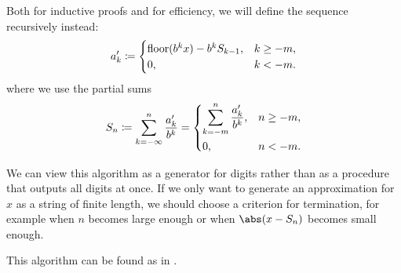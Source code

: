 \begin{algorithm}
\begin{thmenum}
     Both for inductive proofs and for efficiency, we will define the sequence recursively instead:
    \begin{equation}\label{eq:alg:real_number_radix_expansion/recursive}
      a_k' \coloneqq \begin{cases}
        \operatorname{floor}(b^k x) - b^k S_{k - 1}, &k \geq -m, \\
        0,                             &k < -m.
      \end{cases}
    \end{equation}
    where we use the partial sums
    \begin{equation*}
      S_n
      \coloneqq
      \sum_{k=-\infty}^n \frac {a'_k} {b^k}
      =
      \begin{dcases}
        \sum_{k=-m}^n \frac {a'_k} {b^k}, &n \geq -m, \\
        0,                                &n < -m.
      \end{dcases}
    \end{equation*}
  \end{thmenum}
\end{algorithm}
\begin{comments}
  \item We can view this algorithm as a generator for digits rather than as a procedure that outputs all digits at once. If we only want to generate an approximation for \( x \) as a string of finite length, we should choose a criterion for termination, for example when \( n \) becomes large enough or when \( \abs(x - S_n) \) becomes small enough.

  \item This algorithm can be found as  in \cite{notebook:code}.
\end{comments}
